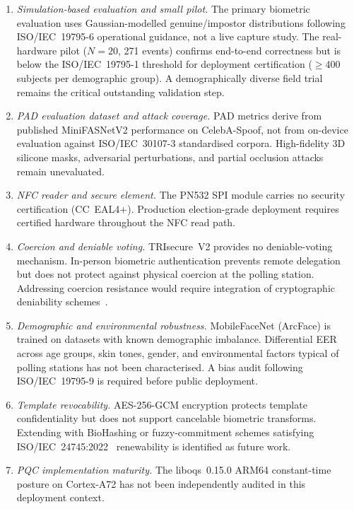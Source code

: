 \documentclass[submission]{sacjsub}
\begin{document}
\begin{enumerate}

  \item \textit{Simulation-based evaluation and small pilot.}
    The primary biometric evaluation uses Gaussian-modelled
    genuine/impostor distributions following ISO/IEC~19795-6
    operational guidance, not a live capture study. The real-hardware
    pilot (\(N{=}20\), 271 events) confirms end-to-end correctness
    but is below the ISO/IEC~19795-1 threshold for deployment
    certification (\(\geq\)400 subjects per demographic group).
    A demographically diverse field trial remains the critical
    outstanding validation step.

  \item \textit{PAD evaluation dataset and attack coverage.}
    PAD metrics derive from published MiniFASNetV2 performance on
    CelebA-Spoof, not from on-device evaluation against
    ISO/IEC~30107-3 standardised corpora. High-fidelity 3D silicone
    masks, adversarial perturbations, and partial occlusion attacks
    remain unevaluated.

  \item \textit{NFC reader and secure element.}
    The PN532 SPI module carries no security certification
    (CC~EAL4\(+\)). Production election-grade deployment requires
    certified hardware throughout the NFC read path.

  \item \textit{Coercion and deniable voting.}
    TRIsecure~V2 provides no deniable-voting mechanism. In-person
    biometric authentication prevents remote delegation but does not
    protect against physical coercion at the polling station.
    Addressing coercion resistance would require integration of
    cryptographic deniability
    schemes~\cite{juels2005coercion,clarkson2008civitas}.

  \item \textit{Demographic and environmental robustness.}
    MobileFaceNet (ArcFace) is trained on datasets with known
    demographic imbalance. Differential EER across age groups, skin
    tones, gender, and environmental factors typical of polling
    stations has not been characterised. A bias audit following
    ISO/IEC~19795-9 is required before public deployment.

  \item \textit{Template revocability.}
    AES-256-GCM encryption protects template confidentiality but does
    not support cancelable biometric transforms. Extending with
    BioHashing or fuzzy-commitment schemes satisfying
    ISO/IEC~24745:2022~\cite{iso24745} renewability is identified as
    future work.

  \item \textit{PQC implementation maturity.}
    The liboqs~0.15.0 ARM64 constant-time posture on Cortex-A72 has
    not been independently audited in this deployment context.

\end{enumerate}
\end{document}
